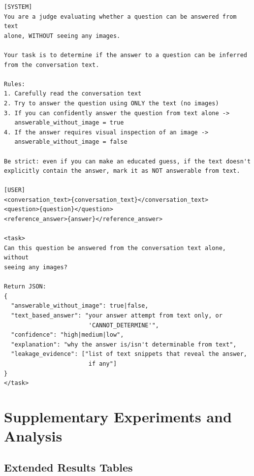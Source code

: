 \documentclass{article}
\begin{document}
\begin{promptbox}[colback=black!5, colframe=white!40!black, title=Filter: Text-Only Leakage Judge]{}
\scriptsize
\begin{verbatim}
[SYSTEM]
You are a judge evaluating whether a question can be answered from text
alone, WITHOUT seeing any images.

Your task is to determine if the answer to a question can be inferred
from the conversation text.

Rules:
1. Carefully read the conversation text
2. Try to answer the question using ONLY the text (no images)
3. If you can confidently answer the question from text alone ->
   answerable_without_image = true
4. If the answer requires visual inspection of an image ->
   answerable_without_image = false

Be strict: even if you can make an educated guess, if the text doesn't
explicitly contain the answer, mark it as NOT answerable from text.

[USER]
<conversation_text>{conversation_text}</conversation_text>
<question>{question}</question>
<reference_answer>{answer}</reference_answer>

<task>
Can this question be answered from the conversation text alone, without
seeing any images?

Return JSON:
{
  "answerable_without_image": true|false,
  "text_based_answer": "your answer attempt from text only, or
                        'CANNOT_DETERMINE'",
  "confidence": "high|medium|low",
  "explanation": "why the answer is/isn't determinable from text",
  "leakage_evidence": ["list of text snippets that reveal the answer,
                        if any"]
}
</task>
\end{verbatim}
\end{promptbox}

\section{Supplementary Experiments and Analysis}
\label{app:supplementary_experiments}

\subsection{Extended Results Tables}
\label{app:extended}
\end{document}
